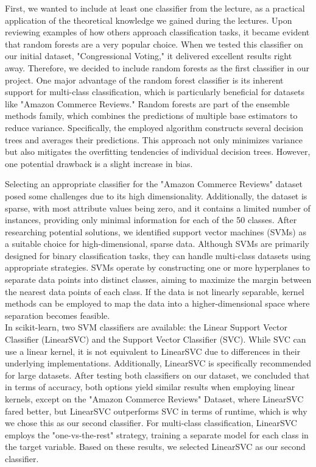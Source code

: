 \documentclass[a4paper,10pt]{article}
\begin{document}
First, we wanted to include at least one classifier from the lecture, as a practical application of the theoretical knowledge we gained during the lectures. Upon reviewing examples of how others approach classification tasks, it became evident that random forests are a very popular choice. When we tested this classifier on our initial dataset, "Congressional Voting," it delivered excellent results right away. Therefore, we decided to include random forests as the first classifier in our project. One major advantage of the random forest classifier is its inherent support for multi-class classification, which is particularly beneficial for datasets like "Amazon Commerce Reviews." Random forests are part of the ensemble methods family, which combines the predictions of multiple base estimators to reduce variance. Specifically, the employed algorithm constructs several decision trees and averages their predictions. This approach not only minimizes variance but also mitigates the overfitting tendencies of individual decision trees. However, one potential drawback is a slight increase in bias.

Selecting an appropriate classifier for the "Amazon Commerce Reviews" dataset posed some challenges due to its high dimensionality. Additionally, the dataset is sparse, with most attribute values being zero, and it contains a limited number of instances, providing only minimal information for each of the 50 classes. After researching potential solutions, we identified support vector machines (SVMs) as a suitable choice for high-dimensional, sparse data. Although SVMs are primarily designed for binary classification tasks, they can handle multi-class datasets using appropriate strategies. SVMs operate by constructing one or more hyperplanes to separate data points into distinct classes, aiming to maximize the margin between the nearest data points of each class. If the data is not linearly separable, kernel methods can be employed to map the data into a higher-dimensional space where separation becomes feasible. \\
In scikit-learn, two SVM classifiers are available: the Linear Support Vector Classifier (LinearSVC) and the Support Vector Classifier (SVC). While SVC can use a linear kernel, it is not equivalent to LinearSVC due to differences in their underlying implementations. Additionally, LinearSVC is specifically recommended for large datasets. After testing both classifiers on our dataset, we concluded that in terms of accuracy, both options yield similar results when employing linear kernels, {\color{red} except on the "Amazon Commerce Reviews" Dataset, where LinearSVC fared better}, but LinearSVC outperforms SVC in terms of runtime, which is why we chose this as our second classifier. For multi-class classification, LinearSVC employs the "one-vs-the-rest" strategy, training a separate model for each class in the target variable. Based on these results, we selected LinearSVC as our second classifier.
\end{document}
